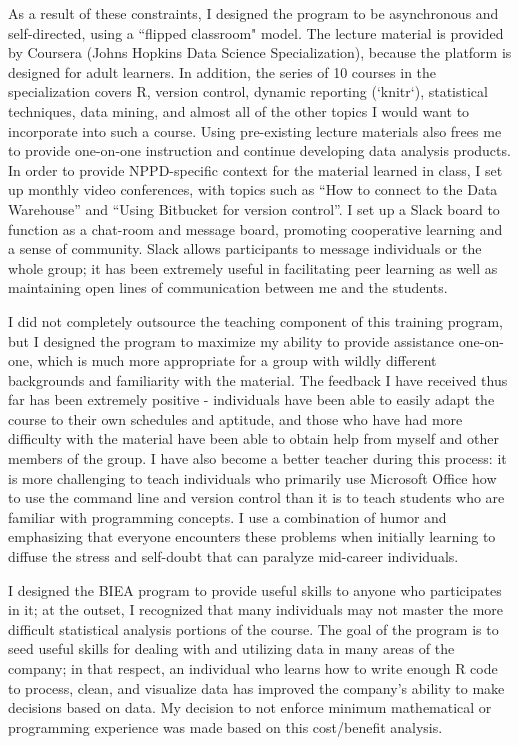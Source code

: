 \documentclass[12pt, letterpaper, sans]{moderncv}
\begin{document}
As a result of these constraints, I designed the program to be asynchronous and self-directed, using a ``flipped classroom" model. The lecture material is provided by Coursera (Johns Hopkins Data Science Specialization), because the platform is designed for adult learners. In addition, the series of 10 courses in the specialization covers R, version control, dynamic reporting (`knitr`), statistical techniques, data mining, and almost all of the other topics I would want to incorporate into such a course. Using pre-existing lecture materials also frees me to provide one-on-one instruction and continue developing data analysis products. In order to provide NPPD-specific context for the material learned in class, I set up monthly video conferences, with topics such as ``How to connect to the Data Warehouse'' and ``Using Bitbucket for version control''. I set up a Slack board to function as a chat-room and message board, promoting cooperative learning and a sense of community. Slack allows participants to message individuals or the whole group; it has been extremely useful in facilitating peer learning as well as maintaining open lines of communication between me and the students. 

I did not completely outsource the teaching component of this training program, but I designed the program to maximize my ability to provide assistance one-on-one, which is much more appropriate for a group with wildly different backgrounds and familiarity with the material. The feedback I have received thus far has been extremely positive - individuals have been able to easily adapt the course to their own schedules and aptitude, and those who have had more difficulty with the material have been able to obtain help from myself and other members of the group. I have also become a better teacher during this process: it is more challenging to teach individuals who primarily use Microsoft Office how to use the command line and version control than it is to teach students who are familiar with programming concepts. I use a combination of humor and emphasizing that everyone encounters these problems when initially learning to diffuse the stress and self-doubt that can paralyze mid-career individuals. 

I designed the BIEA program to provide useful skills to anyone who participates in it; at the outset, I recognized that many individuals may not master the more difficult statistical analysis portions of the course. The goal of the program is to seed useful skills for dealing with and utilizing data in many areas of the company; in that respect, an individual who learns how to write enough R code to process, clean, and visualize data has improved the company's ability to make decisions based on data. My decision to not enforce minimum mathematical or programming experience was made based on this cost/benefit analysis. 
\end{document}
